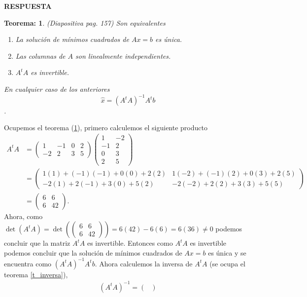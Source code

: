\documentclass[11pt,letterpaper]{article}
\newcommand{\res}{\textbf{RESPUESTA}\\}
\newtheorem{thmt}{Teorema:}
\begin{document}
\begin{itemize}
\res \begin{framed}
    \begin{thmt} \label{t_minimos}
	(Diapositiva pag. 157) Son equivalentes
	\begin{enumerate}
	\item La solución de mínimos cuadrados de $Ax = b$ es única.
	\item Las columnas de $A$ son linealmente independientes.
	\item $A^tA$ es invertible.
	\end{enumerate}
	En cualquier caso de los anteriores $$\hat{x}= (A^tA)^{-1} A^tb$$.
    \end{thmt}
\end{framed}
Ocupemos el teorema (\ref{t_minimos}), primero calculemos el siguiente producto
\begin{align*}
A^tA&=\begin{pmatrix}
1 & -1 & 0 & 2 \\
-2 & 2 & 3 & 5
\end{pmatrix} \begin{pmatrix}
 1 & -2\\
-1 &  2\\
 0 &  3\\
 2 &  5
\end{pmatrix} \\
&=\left(\begin{matrix}
1(1)+\left(-1\right)\left(-1\right)+0(0)+2(2) & 1\left(-2\right)+\left(-1\right)(2)+0(3)+2(5) \\
-2(1)+2\left(-1\right)+3(0)+5(2) & -2\left(-2\right)+2(2)+3(3)+5(5)
\end{matrix}\right)\\
&= \begin{pmatrix}
6 & 6 \\
6 & 42
\end{pmatrix}.
\end{align*}
Ahora, como $\det(A^t A) = \det \left(\begin{pmatrix}
6 & 6 \\
6 & 42
\end{pmatrix} \right) = 6(42)-6(6)=6(36)\neq 0$ podemos concluir que la matriz $A^t A$ es invertible. Entonces como $A^t A$ es invertible podemos concluir que la solución de mínimos cuadrados de $Ax=b$ es única y se encuentra como $(A^tA)^{-1}A^t b$. Ahora calculemos la inversa de $A^t A$ (se ocupa el teorema \ref{t_inversa}),
\begin{align*}
(A^tA)^{-1} = \begin{pmatrix}

\end{pmatrix}
\end{align*}
\end{itemize}
\end{document}
